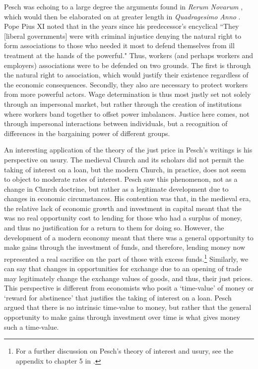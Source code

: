 \documentclass{article}
\begin{document}
Pesch was echoing to a large degree the arguments found in \emph{Rerum Novarum} \citep[no. 49]{leoxii1891}, which would then be elaborated on at greater length in \emph{Quadragesimo Anno} \citep[no. 29-30]{piusxi1931}.  Pope Pius XI noted that in the years since his predecessor’s encyclical ``They [liberal governments] were with criminal injustice denying the natural right to form associations to those who needed it most to defend themselves from ill treatment at the hands of the powerful."  Thus, workers (and perhaps workers and employers) associations were to be defended on two grounds.  The first is through the natural right to association, which would justify their existence regardless of the economic consequences.  Secondly, they also are necessary to protect workers from more powerful actors.  Wage determination is thus most justly set not solely through an impersonal market, but rather through the creation of institutions where workers band together to offset power imbalances.  Justice here comes, not through impersonal interactions between individuals, but a recognition of differences in the bargaining power of different groups.\medskip

An interesting application of the theory of the just price in Pesch’s writings is his perspective on usury.  The medieval Church and its scholars did not permit the taking of interest on a loan, but the modern Church, in practice, does not seem to object to moderate rates of interest.  Pesch saw this phenomenon, not as a change in Church doctrine, but rather as a legitimate development due to changes in economic circumstances.  His contention was that, in the medieval era, the relative lack of economic growth and investment in capital meant that the was no real opportunity cost to lending for those who had a surplus of money, and thus no justification for a return to them for doing so.  However, the development of a modern economy meant that there was a general opportunity to make gains through the investment of funds, and therefore, lending money now represented a real sacrifice on the part of those with excess funds.\footnote{For a further discussion on Pesch’s theory of interest and usury, see the appendix to chapter 5 in \citet{mulcahy1952}.}  Similarly, we can say that changes in opportunities for exchange due to an opening of trade may legitimately change the exchange values of goods, and thus, their just prices.  This perspective is different from economists who posit a ‘time-value’ of money or ‘reward for abstinence’ that justifies the taking of interest on a loan.  Pesch argued that there is no intrinsic time-value to money, but rather that the general opportunity to make gains through investment over time is what gives money such a time-value.\medskip
\end{document}
